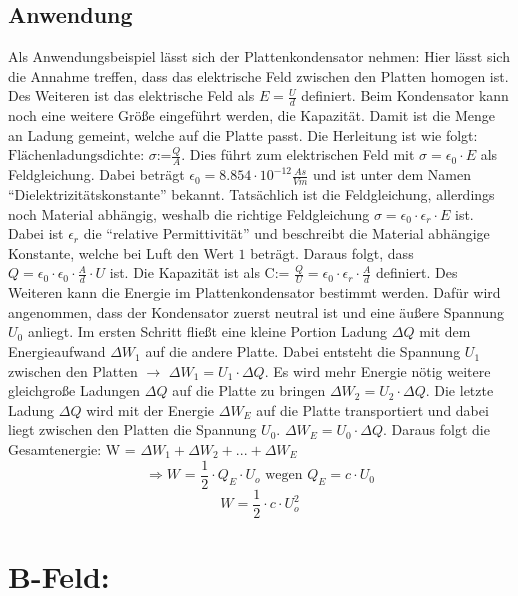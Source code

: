 \subsection{Anwendung}
Als Anwendungsbeispiel lässt sich der Plattenkondensator nehmen:
Hier lässt sich die Annahme treffen, dass das elektrische Feld zwischen den Platten homogen ist.
Des Weiteren ist das elektrische Feld als $E = \frac{U}{d}$ definiert.
Beim Kondensator kann noch eine weitere Größe eingeführt werden, die Kapazität.
Damit ist die Menge an Ladung gemeint, welche auf die Platte passt.
Die Herleitung ist wie folgt:
$\mbox{Flächenladungsdichte: } \sigma \mbox{:=} \frac{Q}{A}$.
Dies führt zum elektrischen Feld mit $\sigma = \epsilon_0 \cdot E$ als Feldgleichung.
Dabei beträgt $\epsilon_0 = 8.854 \cdot 10^{-12} \frac{As}{Vm}$ und ist unter dem Namen "`Dielektrizitätskonstante"' bekannt.
Tatsächlich ist die Feldgleichung, allerdings noch Material abhängig, weshalb die richtige Feldgleichung $\sigma = \epsilon_0 \cdot \epsilon_r \cdot E$ ist.
Dabei ist $\epsilon_r$ die "`relative Permittivität"' und beschreibt die Material abhängige Konstante, welche bei Luft den Wert $1$ beträgt.
Daraus folgt, dass $ Q = \epsilon_0 \cdot \epsilon_0 \cdot \frac{A}{d} \cdot U$ ist.
Die Kapazität ist als $\mbox{C:= } \frac{Q}{U} = \epsilon_0 \cdot \epsilon_r \cdot \frac{A}{d}$ definiert.
Des Weiteren kann die Energie im Plattenkondensator bestimmt werden.
Dafür wird angenommen, dass der Kondensator zuerst neutral ist und eine äußere Spannung $U_0$ anliegt.
Im ersten Schritt fließt eine kleine Portion Ladung $\Delta Q$ mit dem Energieaufwand $\Delta W_1$ auf die andere Platte. Dabei entsteht die Spannung $U_1$ zwischen den Platten $\rightarrow$ $\Delta W_1 = U_1 \cdot \Delta Q$.
Es wird mehr Energie nötig weitere gleichgroße Ladungen $\Delta Q$ auf die Platte zu bringen $\Delta W_2 = U_2 \cdot \Delta Q$.
Die letzte Ladung $\Delta Q$ wird mit der Energie $\Delta W_E$ auf die Platte transportiert und dabei liegt zwischen den Platten die Spannung $U_0$. 
$\Delta W_E = U_0 \cdot \Delta Q$.
Daraus folgt die Gesamtenergie: W = $\Delta W_1 + \Delta W_2 +...+ \Delta W_E$
$$\Rightarrow W \mbox{ = } \frac{1}{2}\cdot Q_E \cdot U_o \mbox{ wegen $Q_E = c \cdot U_0$}$$
$$W= \frac{1}{2} \cdot c \cdot U_o^2$$
\section{B-Feld:}

